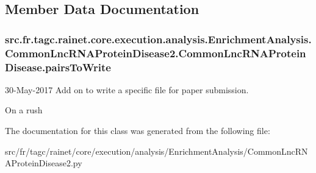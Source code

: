\subsection{Member Data Documentation}
\hypertarget{classsrc_1_1fr_1_1tagc_1_1rainet_1_1core_1_1execution_1_1analysis_1_1EnrichmentAnalysis_1_1Commo70ca5c91857cc3a649e8e2158b3a9c9f_a26d410f4b6627c31f1f3d1d77a896646}{
\subsubsection[{pairs\-To\-Write}]{\setlength{\rightskip}{0pt plus 5cm}src.\-fr.\-tagc.\-rainet.\-core.\-execution.\-analysis.\-Enrichment\-Analysis.\-Common\-Lnc\-R\-N\-A\-Protein\-Disease2.\-Common\-Lnc\-R\-N\-A\-Protein\-Disease.\-pairs\-To\-Write}}\label{classsrc_1_1fr_1_1tagc_1_1rainet_1_1core_1_1execution_1_1analysis_1_1EnrichmentAnalysis_1_1Commo70ca5c91857cc3a649e8e2158b3a9c9f_a26d410f4b6627c31f1f3d1d77a896646}


30-\/\-May-\/2017 Add on to write a specific file for paper submission. 

On a rush 

The documentation for this class was generated from the following file\-:\begin{DoxyCompactItemize}
\item 
src/fr/tagc/rainet/core/execution/analysis/\-Enrichment\-Analysis/Common\-Lnc\-R\-N\-A\-Protein\-Disease2.\-py\end{DoxyCompactItemize}
